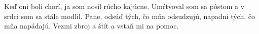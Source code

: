 Keď oni boli chorí,
ja som nosil rúcho kajúcne.
Umŕtvoval som sa pôstom
a v srdci som sa stále modlil.
\versseparator
Pane, odsúď tých, čo mňa odsudzujú,
napadni tých, čo mňa napádajú.
Vezmi zbroj a štít
a vstaň mi na pomoc.